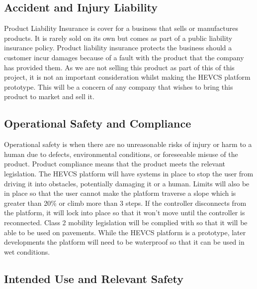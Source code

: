 \documentclass [12pt]{article}
\begin{document}
\subsection{Accident and Injury Liability}\label{sec:Accident_and_Injury_Liabilty}

Product Liability Insurance is cover for a business that sells or manufactures products. It is rarely sold on its own but comes as part of a public liability insurance policy. Product liability insurance protects the business should a customer incur damages because of a fault with the product that the company has provided them. \cite{Liabilty_Insurance}  As we are not selling this product as part of this of this project, it is not an important consideration whilst making the HEVCS platform prototype. This will be a concern of any company that wishes to bring this product to market and sell it.

\subsection{Operational Safety and Compliance}\label{sec:Operational_Safety_and_Compliance}

Operational safety is when there are no unreasonable risks of injury or harm to a human due to defects, environmental conditions, or foreseeable misuse of the product. Product compliance means that the product meets the relevant legislation.
The HEVCS platform will have systems in place to stop the user from driving it into obstacles, potentially damaging it or a human. Limits will also be in place so that the user cannot make the platform traverse a slope which is greater than 20\% or climb more than 3 steps. If the controller disconnects from the platform, it will lock into place so that it won’t move until the controller is reconnected. Class 2 mobility legislation will be complied with so that it will be able to be used on pavements. While the HEVCS platform is a prototype, later developments the platform will need to be waterproof so that it can be used in wet conditions. \cite{IP_Rating}

\subsection{Intended Use and Relevant Safety}\label{sec:Intended_Use_and_Relevant_Safety}
\end{document}
